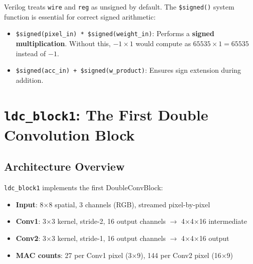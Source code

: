 \documentclass[11pt,a4paper]{report}
\begin{document}
Verilog treats \texttt{wire} and \texttt{reg} as unsigned by default. The \texttt{\$signed()} system function is essential for correct signed arithmetic:

\begin{itemize}[leftmargin=2em]
    \item \texttt{\$signed(pixel\_in) * \$signed(weight\_in)}: Performs a \textbf{signed multiplication}. Without this, $-1 \times 1$ would compute as $65535 \times 1 = 65535$ instead of $-1$.
    
    \item \texttt{\$signed(acc\_in) + \$signed(w\_product)}: Ensures sign extension during addition.
\end{itemize}


\section{\texttt{ldc\_block1}: The First Double Convolution Block}

\subsection{Architecture Overview}

\texttt{ldc\_block1} implements the first DoubleConvBlock:
\begin{itemize}[leftmargin=2em]
    \item \textbf{Input}: 8$\times$8 spatial, 3 channels (RGB), streamed pixel-by-pixel
    \item \textbf{Conv1}: 3$\times$3 kernel, stride-2, 16 output channels $\rightarrow$ 4$\times$4$\times$16 intermediate
    \item \textbf{Conv2}: 3$\times$3 kernel, stride-1, 16 output channels $\rightarrow$ 4$\times$4$\times$16 output
    \item \textbf{MAC counts}: 27 per Conv1 pixel (3$\times$9), 144 per Conv2 pixel (16$\times$9)
\end{itemize}
\end{document}

